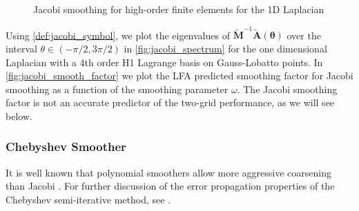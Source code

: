 \documentclass[review]{siamart190516}
\begin{document}
\begin{figure}[!tbp]
  \centering
  \hfill
  \caption{Jacobi smoothing for high-order finite elements for the 1D Laplacian}
\end{figure}

Using \cref{def:jacobi_symbol}, we plot the eigenvalues of $\tilde{\mathbf{M}}^{-1} \tilde{\mathbf{A}} \left( \boldsymbol{\theta} \right)$ over the interval $\theta \in \left( - \pi / 2, 3 \pi / 2 \right)$ in \cref{fig:jacobi_spectrum} for the one dimensional Laplacian with a 4th order H1 Lagrange basis on Gauss-Lobatto points.
In \cref{fig:jacobi_smooth_factor} we plot the LFA predicted smoothing factor for Jacobi smoothing as a function of the smoothing parameter $\omega$.
The Jacobi smoothing factor is not an accurate predictor of the two-grid performance, as we will see below.

\subsubsection{Chebyshev Smoother}\label{sec:chebyshev}

It is well known that polynomial smoothers allow more aggressive coarsening than Jacobi \cite{brannick2015polynomial}.
For further discussion of the error propagation properties of the Chebyshev semi-iterative method, see \cite{gutknecht2002revisited}.
\end{document}
